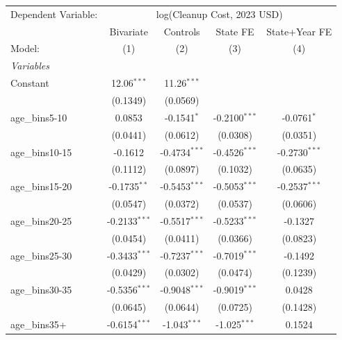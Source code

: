 
\begingroup
\centering
\begin{tabular}{lcccc}
   \tabularnewline \midrule \midrule
   Dependent Variable: & \multicolumn{4}{c}{log(Cleanup Cost, 2023 USD)}\\
                              & Bivariate       & Controls        & State FE        & State+Year FE \\   
   Model:                     & (1)             & (2)             & (3)             & (4)\\  
   \midrule
   \emph{Variables}\\
   Constant                   & 12.06$^{***}$   & 11.26$^{***}$   &                 &   \\   
                              & (0.1349)        & (0.0569)        &                 &   \\   
   age\_bins5-10              & 0.0853          & -0.1541$^{*}$   & -0.2100$^{***}$ & -0.0761$^{*}$\\   
                              & (0.0441)        & (0.0612)        & (0.0308)        & (0.0351)\\   
   age\_bins10-15             & -0.1612         & -0.4734$^{***}$ & -0.4526$^{***}$ & -0.2730$^{***}$\\   
                              & (0.1112)        & (0.0897)        & (0.1032)        & (0.0635)\\   
   age\_bins15-20             & -0.1735$^{**}$  & -0.5453$^{***}$ & -0.5053$^{***}$ & -0.2537$^{***}$\\   
                              & (0.0547)        & (0.0372)        & (0.0537)        & (0.0606)\\   
   age\_bins20-25             & -0.2133$^{***}$ & -0.5517$^{***}$ & -0.5233$^{***}$ & -0.1327\\   
                              & (0.0454)        & (0.0411)        & (0.0366)        & (0.0823)\\   
   age\_bins25-30             & -0.3433$^{***}$ & -0.7237$^{***}$ & -0.7019$^{***}$ & -0.1492\\   
                              & (0.0429)        & (0.0302)        & (0.0474)        & (0.1239)\\   
   age\_bins30-35             & -0.5356$^{***}$ & -0.9048$^{***}$ & -0.9019$^{***}$ & 0.0428\\   
                              & (0.0645)        & (0.0644)        & (0.0725)        & (0.1428)\\   
   age\_bins35+               & -0.6154$^{***}$ & -1.043$^{***}$  & -1.025$^{***}$  & 0.1524\\   

\end{tabular}
